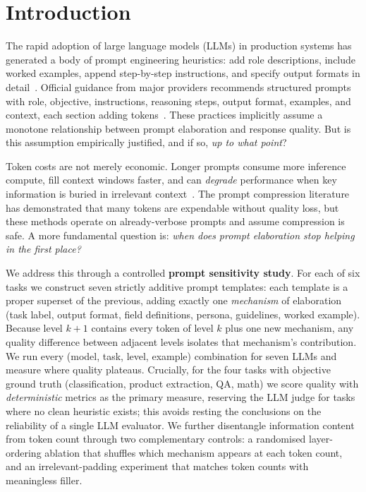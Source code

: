 \section{Introduction}
\label{sec:intro}

The rapid adoption of large language models (LLMs) in production systems
has generated a body of prompt engineering heuristics: add role descriptions,
include worked examples, append step-by-step instructions, and specify output
formats in detail~\citep{brown2020gpt3,wei2022cot,zhou2022large}.
Official guidance from major providers recommends structured prompts with
role, objective, instructions, reasoning steps, output format, examples,
and context, each section adding tokens~\citep{sahoo2024systematic,schulhoff2024prompt}.
These practices implicitly assume a monotone relationship between prompt
elaboration and response quality.
But is this assumption empirically justified, and if so, \emph{up to what
point}?

Token costs are not merely economic.
Longer prompts consume more inference compute, fill context windows faster,
and can \emph{degrade} performance when key information is buried in
irrelevant context~\citep{liu2023lost}.
The prompt compression literature~\citep{jiang2023llmlingua,pan2024llmlingua2}
has demonstrated that many tokens are expendable without quality loss, but
these methods operate on already-verbose prompts and assume compression is
safe.
A more fundamental question is: \emph{when does prompt elaboration stop
helping in the first place?}

We address this through a controlled \textbf{prompt sensitivity study}.
For each of six tasks we construct seven strictly additive prompt templates:
each template is a proper superset of the previous, adding exactly one
\emph{mechanism} of elaboration (task label, output format, field definitions,
persona, guidelines, worked example).
Because level $k{+}1$ contains every token of level $k$ plus one new mechanism,
any quality difference between adjacent levels isolates that mechanism's
contribution.
We run every (model, task, level, example) combination for seven LLMs and
measure where quality plateaus.
Crucially, for the four tasks with objective ground truth (classification,
product extraction, QA, math) we score quality with \emph{deterministic}
metrics as the primary measure, reserving the LLM judge for tasks where no
clean heuristic exists; this avoids resting the conclusions on the reliability
of a single LLM evaluator.
We further disentangle information content from token count through two
complementary controls: a randomised layer-ordering ablation that shuffles
which mechanism appears at each token count, and an irrelevant-padding
experiment that matches token counts with meaningless filler.

